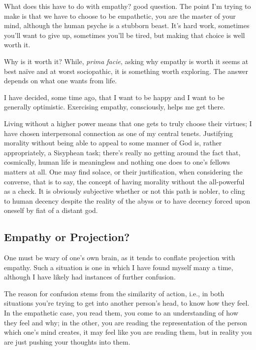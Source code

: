 \documentclass[../butidigress.tex]{subfiles}
\begin{document}
What does this have to do with empathy? good question.
The point I'm trying to make is that we have to choose to be empathetic, you are the master of your mind, although the human psyche is a stubborn beast.
It's hard work, sometimes you'll want to give up, sometimes you'll be tired, but making that choice is well worth it.

Why is it worth it?
While, \textit{prima facie}, asking why empathy is worth it seems at best na\"ive and at worst sociopathic, it is something worth exploring.
The answer depends on what one wants from life.

I have decided, some time ago, that I want to be happy and I want to be generally optimistic.
Exercising empathy, consciously, helps me get there.

Living without a higher power means that one gets to truly choose their virtues; I have chosen interpersonal connection as one of my central tenets.
Justifying morality without being able to appeal to some manner of God is, rather appropriately, a Sisyphean task; there's really no getting around the fact that, cosmically, human life is meaningless and nothing one does to one's fellows matters at all.
One may find solace, or their justification, when considering the converse, that is to say, the concept of having morality without the all-powerful as a check.
It is obviously subjective whether or not this path is nobler, to cling to human decency despite the reality of the abyss or to have decency forced upon oneself by fiat of a distant god.

\subsection{Empathy or Projection?}
One must be wary of one's own brain, as it tends to conflate projection with empathy.
Such a situation is one in which I have found myself many a time, although I have likely had instances of further confusion.

The reason for confusion stems from the similarity of action, i.e., in both situations you're trying to get into another person's head, to know how they feel.
In the empathetic case, you read them, you come to an understanding of how they feel and why; in the other, you are reading the representation of the person which one's mind creates, it may feel like you are reading them, but in reality you are just pushing your thoughts into them.
\end{document}
